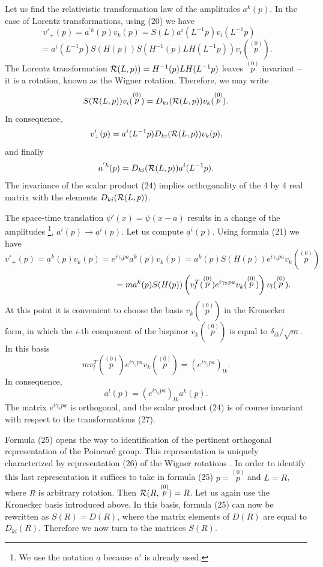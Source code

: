 \documentclass[12pt]{article}
\begin{document}
Let us find the relativistic transformation law of the amplitudes $a^k(p)$. In the case of Lorentz transformations,  using (20)  we have 
\[  v'_+(p) = a^{'k}(p) v_k(p) = S(L) a^i(L^{-1}p) v_i(L^{-1}p)  \;\;\;\;\;\; \]  \[    =  a^i(L^{-1}p) S(H(p)) S(H^{-1}(p) L H(L^{-1}p)) v_i( \stackrel{(0)}{p} ).    \] 
The Lorentz transformation ${\cal R}(L,p)) =H^{-1}(p) L H(L^{-1}p)$  leaves  $\stackrel{(0)}{p}$  invariant -- it is a rotation, known as the Wigner rotation.  Therefore, we may write 
\begin{equation}
S({\cal R}(L,p)) v_i( \stackrel{(0)}{p} ) =  D_{ki}({\cal R}(L,p))  v_k( \stackrel{(0)}{p} ). \end{equation}
  In consequence,  \[v'_+(p) = a^i(L^{-1}p) D_{ki}({\cal R}(L,p)) v_k(p),   \] and  finally
\begin{equation}
a^{'k}(p) =  D_{ki}({\cal R}(L,p))  a^i(L^{-1}p).
\end{equation}
The  invariance of the scalar product  (24)   implies orthogonality of the 4 by 4 real matrix  with the elements $D_{ki}({\cal R}(L,p))$.

The space-time translation  $\psi'(x) = \psi(x-a)$  results in a change of the amplitudes \footnote{We use the notation $\underline{a}$  because $a'$ is already  used.}, $ a^i(p) \rightarrow \underline{a}^i(p).$  Let us compute  $\underline{a}^i(p)$.  Using formula (21) we have 
\[ v'_+(p) = \underline{ a}^k(p) v_k(p) = e^{i \gamma_5 pa} a^k(p) v_k(p) = a^k(p) S(H(p))  e^{i \gamma_5 pa} v_k( \stackrel{(0)}{p} ) \]
\[  \hspace*{4cm}   = m a^k(p) S(H(p)) \left(v_l^T( \stackrel{(0)}{p} ) e^{i \gamma_5 pa}  v_k( \stackrel{(0)}{p} ) \right)  v_l( \stackrel{(0)}{p} ). \]
At this point it is convenient to choose the  basis   $v_k( \stackrel{(0)}{p} )$  in the Kronecker form, in which the $i$-th component of the bispinor  $ v_k( \stackrel{(0)}{p} )$  is equal to $\delta_{ik}/\sqrt{m}$.  In this basis 
\[ m  v_l^T( \stackrel{(0)}{p} ) e^{i \gamma_5 pa}  v_k( \stackrel{(0)}{p} )  = ( e^{i \gamma_5 pa})_{lk}.\]  In consequence, 
\begin{equation}
\underline{a}^l(p) =  ( e^{i \gamma_5 pa})_{lk} a^k(p).   
\end{equation}
The matrix  $ e^{i \gamma_5 pa}$ is  orthogonal, and the scalar product  (24)  is of course invariant  with respect to  the transformations (27). 





Formula (25) opens the way to identification of the pertinent  orthogonal  representation of the Poincar\'e group.  This representation  is uniquely characterized by representation (26)  of the Wigner rotations \cite{15}. In order to identify this last representation it suffices to take  in formula (25)  $p =  \stackrel{(0)}{p}$ and $ L =R$, where $R$ is arbitrary rotation.  Then ${\cal R}(R,  \stackrel{(0)}{p}) = R$.  Let us again use the Kronecker basis introduced above. In this basis, formula (25) can now be rewritten as  $ S(R)= D(R)$, where the matrix elements of $D(R)$  are equal to   $D_{ki}(R)$.  Therefore we now turn to the matrices $S(R)$. 
\end{document}
